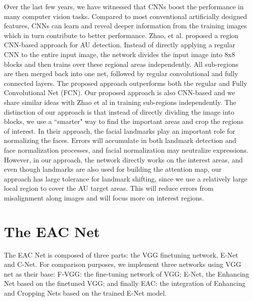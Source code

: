 \documentclass[a4paper, 10pt, conference]{ieeeconf}      %
\begin{document}
Over the last few years, we have witnessed that CNNs boost the performance in many computer vision tasks. Compared to most conventional artificially designed features, CNNs can learn and reveal deeper information from the training images which in turn contribute to better performance. Zhao, et al. \cite{p22} proposed a region CNN-based approach for AU detection. Instead of directly applying a regular CNN to the entire input image, the network divides the input image into 8x8 blocks and then trains over these regional areas independently. All sub-regions are then merged back into one net, followed by regular convolutional and fully connected layers. The proposed approach outperforms both the regular and Fully Convolutional Net (FCN).
Our proposed approach is also CNN-based and we share similar ideas with Zhao et al \cite{p22} in training sub-regions independently. The distinction of our approach is that instead of directly dividing the image into blocks, we use a ``smarter" way to find the important areas and crop the regions of interest. In their approach, the facial landmarks play an important role for normalizing the faces. Errors will accumulate in both landmark detection and face normalization processes, and facial normalization may neutralize expressions. However, in our approach, the network directly works on the interest areas, and even though landmarks are also used for building the attention map, our approach has large tolerance for landmark shifting, since we use a relatively large local region to cover the AU target areas. This will reduce errors from misalignment along images and will focus more on interest regions.

\section{The EAC Net}

The EAC Net is composed of three parts: the VGG finetuning network, E-Net and C-Net. For comparison purposes, we implement three networks using VGG net as their base: F-VGG: the fine-tuning network of VGG; E-Net, the Enhancing Net based on the finetuned VGG; and finally EAC: the integration of Enhancing and Cropping Nets based on the trained E-Net model.
\end{document}
